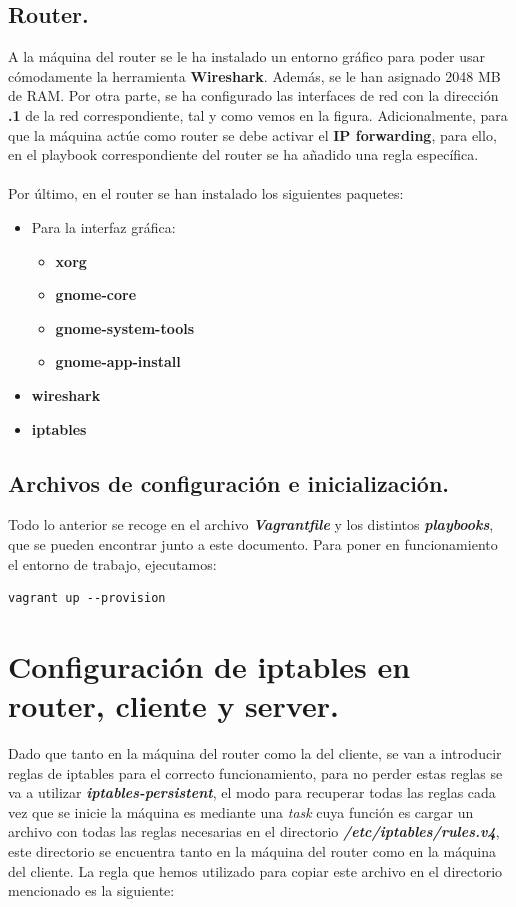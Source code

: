 \documentclass[11pt]{article}
\begin{document}
\subsection{Router.}
A la máquina del router se le ha instalado un entorno gráfico para poder usar cómodamente la herramienta \textbf{Wireshark}. Además, se le han asignado 2048 MB de RAM. Por otra parte, se ha configurado las interfaces de red con la dirección \textbf{.1} de la red correspondiente, tal y como vemos en la figura. Adicionalmente, para que la máquina actúe como router se debe activar el \textbf{IP forwarding}, para ello, en el playbook correspondiente del router se ha añadido una regla específica. \\ \\
Por último, en el router se han instalado los siguientes paquetes:
\begin{itemize}
\item Para la interfaz gráfica:
	\begin{itemize}
		\item \textbf{xorg}
		\item \textbf{gnome-core}
		\item \textbf{gnome-system-tools}
		\item \textbf{gnome-app-install}
	\end{itemize}
\item \textbf{wireshark}
\item \textbf{iptables}			
\end{itemize}

\subsection{Archivos de configuración e inicialización.}
Todo lo anterior se recoge en el archivo \textbf{\textit{Vagrantfile}} y los distintos \textbf{\textit{playbooks}}, que se pueden encontrar junto a este documento. Para poner en funcionamiento el entorno de trabajo, ejecutamos:
\begin{lstlisting}[style=C,numbers=none]
	vagrant up --provision
\end{lstlisting}

\section{Configuración de iptables en router, cliente y server.}
Dado que tanto en la máquina del router como la del cliente, se van a introducir reglas de iptables para el correcto funcionamiento, para no perder estas reglas se va a utilizar \textbf{\textit{iptables-persistent}}, el modo para recuperar todas las reglas cada vez que se inicie la máquina es mediante una \textit{task} cuya función es cargar un archivo con todas las reglas necesarias en el directorio \textbf{\textit{/etc/iptables/rules.v4}}, este directorio se encuentra tanto en la máquina del router como en la máquina del cliente. La regla que hemos utilizado para copiar este archivo en el directorio mencionado es la siguiente:
\end{document}
